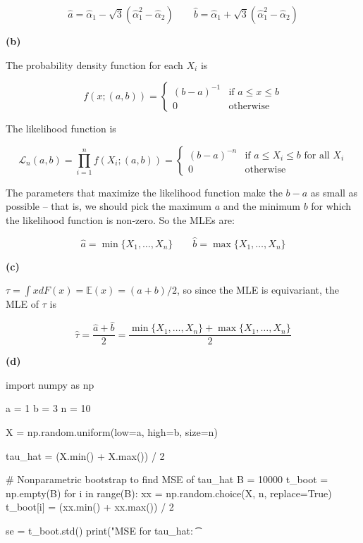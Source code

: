 \[
\hat{a} = \hat{\alpha}_1 - \sqrt{3}(\hat{\alpha}_1^2 - \hat{\alpha}_2)
\quad \quad
\hat{b} = \hat{\alpha}_1 + \sqrt{3}(\hat{\alpha}_1^2 - \hat{\alpha}_2)
\]

\textbf{(b)}

The probability density function for each \(X_i\) is

\[f(x; (a, b)) = \begin{cases}
(b - a)^{-1} & \text{if } a \leq x \leq b \\
0 & \text{otherwise}
\end{cases}\]

The likelihood function is

\[\mathcal{L}_n(a, b) = \prod_{i=1}^n f(X_i; (a, b)) = \begin{cases}
(b-a)^{-n} & \text{if } a \leq X_i \leq b \text{ for all } X_i\\
0 & \text{otherwise}
\end{cases}
\]

The parameters that maximize the likelihood function make the \(b - a\)
as small as possible -- that is, we should pick the maximum \(a\) and
the minimum \(b\) for which the likelihood function is non-zero. So the
MLEs are:

\[\hat{a} = \min \{X_1, \dots, X_n \}
\quad \quad
\hat{b} = \max \{X_1, \dots, X_n \}\]

\textbf{(c)}

\(\tau = \int x dF(x) = \mathbb{E}(x) = (a + b)/2\), so since the MLE is
equivariant, the MLE of \(\tau\) is

\[\hat{\tau} = \frac{\hat{a} + \hat{b}}{2} = \frac{\min \{X_1, \dots, X_n\} + \max\{X_1, \dots, X_n\}}{2}\]

\textbf{(d)}

\begin{python}
import numpy as np

a = 1
b = 3
n = 10

X = np.random.uniform(low=a, high=b, size=n)
\end{python}

\begin{python}
tau_hat = (X.min() + X.max()) / 2

# Nonparametric bootstrap to find MSE of tau_hat
B = 10000
t_boot = np.empty(B)
for i in range(B):
    xx = np.random.choice(X, n, replace=True)
    t_boot[i] = (xx.min() + xx.max()) / 2
    
se = t_boot.std()
print("MSE for tau_hat: \t %
\end{python}

